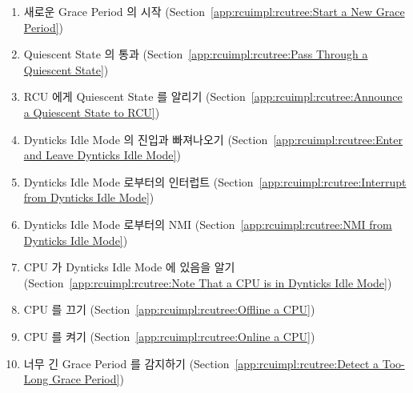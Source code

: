 \begin{enumerate}
\item	새로운 Grace Period 의 시작
	(Section~\ref{app:rcuimpl:rcutree:Start a New Grace Period})
\item	Quiescent State 의 통과
	(Section~\ref{app:rcuimpl:rcutree:Pass Through a Quiescent State})
\item	RCU 에게 Quiescent State 를 알리기
	(Section~\ref{app:rcuimpl:rcutree:Announce a Quiescent State to RCU})
\item	Dynticks Idle Mode 의 진입과 빠져나오기
	(Section~\ref{app:rcuimpl:rcutree:Enter and Leave Dynticks Idle Mode})
\item	Dynticks Idle Mode 로부터의 인터럽트
	(Section~\ref{app:rcuimpl:rcutree:Interrupt from Dynticks Idle Mode})
\item	Dynticks Idle Mode 로부터의 NMI
	(Section~\ref{app:rcuimpl:rcutree:NMI from Dynticks Idle Mode})
\item	CPU 가 Dynticks Idle Mode 에 있음을 알기
	(Section~\ref{app:rcuimpl:rcutree:Note That a CPU is in Dynticks Idle Mode})
\item	CPU 를 끄기
	(Section~\ref{app:rcuimpl:rcutree:Offline a CPU})
\item	CPU 를 켜기
	(Section~\ref{app:rcuimpl:rcutree:Online a CPU})
\item	너무 긴 Grace Period 를 감지하기
	(Section~\ref{app:rcuimpl:rcutree:Detect a Too-Long Grace Period})
\iffalse

\item	Start a New Grace Period
	(Section~\ref{app:rcuimpl:rcutree:Start a New Grace Period})
\item	Pass Through a Quiescent State
	(Section~\ref{app:rcuimpl:rcutree:Pass Through a Quiescent State})
\item	Announce a Quiescent State to RCU
	(Section~\ref{app:rcuimpl:rcutree:Announce a Quiescent State to RCU})
\item	Enter and Leave Dynticks Idle Mode
	(Section~\ref{app:rcuimpl:rcutree:Enter and Leave Dynticks Idle Mode})
\item	Interrupt from Dynticks Idle Mode
	(Section~\ref{app:rcuimpl:rcutree:Interrupt from Dynticks Idle Mode})
\item	NMI from Dynticks Idle Mode
	(Section~\ref{app:rcuimpl:rcutree:NMI from Dynticks Idle Mode})
\item	Note That a CPU is in Dynticks Idle Mode
	(Section~\ref{app:rcuimpl:rcutree:Note That a CPU is in Dynticks Idle Mode})
\item	Offline a CPU
	(Section~\ref{app:rcuimpl:rcutree:Offline a CPU})
\item	Online a CPU
	(Section~\ref{app:rcuimpl:rcutree:Online a CPU})
\item	Detect a Too-Long Grace Period
	(Section~\ref{app:rcuimpl:rcutree:Detect a Too-Long Grace Period})
\fi
\end{enumerate}

